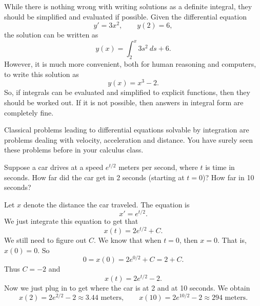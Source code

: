 \documentclass{ximera}
\begin{document}
While there is nothing wrong with writing solutions as a definite integral, they should be simplified and evaluated if possible. Given the differential equation
\[ 
    y' = 3x^2, \qquad y(2) = 6, 
\] 
the solution can be written as 
\[
    y(x) = \int_2^x 3s^2\ ds + 6.
\] 
However, it is much more convenient, both for human reasoning and computers, to write this solution as 
\[ 
    y(x) = x^3 - 2.
\] 
So, if integrals can be evaluated and simplified to explicit functions, then they should be worked out. If it is not possible, then answers in integral form are completely fine. 

Classical problems leading to differential equations solvable by integration are problems dealing with velocity, acceleration and distance.  You have surely seen these problems before in your calculus class.

\begin{example}
    Suppose a car drives at a speed $e^{t/2}$ meters per second, where $t$ is time in seconds. How far did the car get in 2 seconds (starting at $t=0$)?  How far in 10 seconds?
\end{example}

\begin{exampleSol}
    Let $x$ denote the distance the car traveled. The equation is
    \begin{equation*}
        x' = e^{t/2} .
    \end{equation*}
    We just integrate this equation to get that
    \begin{equation*}
        x(t) = 2 e^{t/2} + C . 
    \end{equation*}
    We still need to figure out $C$.  We know that when $t=0$, then $x=0$.  That is, $x(0) = 0$.  So
    \begin{equation*}
        0 = x(0) = 2e^{0/2} + C = 2 + C .
    \end{equation*}
    Thus $C = -2$ and 
    \begin{equation*}
        x(t) = 2 e^{t/2} - 2 .
    \end{equation*}
    Now we just plug in to get where the car is at 2 and at 10 seconds. We obtain
    \begin{equation*}
        x(2) = 2e^{2/2} - 2 \approx 3.44 \text{ meters} , \qquad x(10) = 2e^{10/2} - 2 \approx 294 \text{ meters} .
    \end{equation*}
\end{exampleSol}
\end{document}
